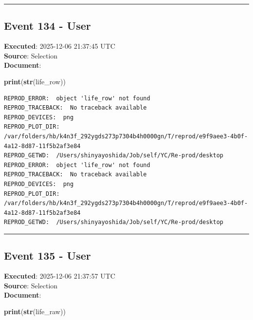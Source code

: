 \documentclass[
  11pt,
]{article}
\newenvironment{Shaded}{\begin{snugshade}}{\end{snugshade}}
\newcommand{\FunctionTok}[1]{\textcolor[rgb]{0.13,0.29,0.53}{\textbf{#1}}}
\newcommand{\NormalTok}[1]{#1}
\newenvironment{rpoutput}{\vspace{0.5em}\begin{snugshade}}{\end{snugshade}}
\begin{document}
\begin{center}\rule{0.5\linewidth}{0.5pt}\end{center}

\subsection{Event 134 - User}\label{event-134---user}

\textbf{Executed}: 2025-12-06 21:37:45 UTC\\
\textbf{Source}: Selection\\
\textbf{Document}:

\begin{Shaded}
\begin{Highlighting}[]
\FunctionTok{print}\NormalTok{(}\FunctionTok{str}\NormalTok{(life\_row))}
\end{Highlighting}
\end{Shaded}

\begin{rpoutput}

\begin{verbatim}
REPROD_ERROR:  object 'life_row' not found 
REPROD_TRACEBACK:  No traceback available  
REPROD_DEVICES:  png 
REPROD_PLOT_DIR:  /var/folders/hb/k4n3f_292ygds273p7304b4h0000gn/T/reprod/e9f9aee3-4b0f-4a12-8d87-11f5b2af3e84 
REPROD_GETWD:  /Users/shinyayoshida/Job/self/YC/Re-prod/desktop 
REPROD_ERROR:  object 'life_row' not found 
REPROD_TRACEBACK:  No traceback available  
REPROD_DEVICES:  png 
REPROD_PLOT_DIR:  /var/folders/hb/k4n3f_292ygds273p7304b4h0000gn/T/reprod/e9f9aee3-4b0f-4a12-8d87-11f5b2af3e84 
REPROD_GETWD:  /Users/shinyayoshida/Job/self/YC/Re-prod/desktop 
\end{verbatim}

\end{rpoutput}

\begin{center}\rule{0.5\linewidth}{0.5pt}\end{center}

\subsection{Event 135 - User}\label{event-135---user}

\textbf{Executed}: 2025-12-06 21:37:57 UTC\\
\textbf{Source}: Selection\\
\textbf{Document}:

\begin{Shaded}
\begin{Highlighting}[]
\FunctionTok{print}\NormalTok{(}\FunctionTok{str}\NormalTok{(life\_raw))}
\end{Highlighting}
\end{Shaded}
\end{document}
